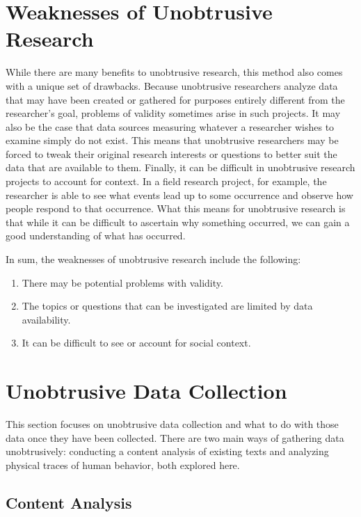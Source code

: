 \section{Weaknesses of Unobtrusive Research}

While there are many benefits to unobtrusive research, this method also comes with a unique set of drawbacks. Because unobtrusive researchers analyze data that may have been created or gathered for purposes entirely different from the researcher's goal, problems of validity sometimes arise in such projects. It may also be the case that data sources measuring whatever a researcher wishes to examine simply do not exist. This means that unobtrusive researchers may be forced to tweak their original research interests or questions to better suit the data that are available to them. Finally, it can be difficult in unobtrusive research projects to account for context. In a field research project, for example, the researcher is able to see what events lead up to some occurrence and observe how people respond to that occurrence. What this means for unobtrusive research is that while it can be difficult to ascertain why something occurred, we can gain a good understanding of what has occurred.

In sum, the weaknesses of unobtrusive research include the following:

\begin{enumerate}
	\item There may be potential problems with validity.
	\item The topics or questions that can be investigated are limited by data availability.
	\item It can be difficult to see or account for social context.
\end{enumerate}

\section{Unobtrusive Data Collection}

This section focuses on unobtrusive data collection and what to do with those data once they have been collected. There are two main ways of gathering data unobtrusively: conducting a content analysis of existing texts and analyzing physical traces of human behavior, both explored here.

\subsection{Content Analysis}

